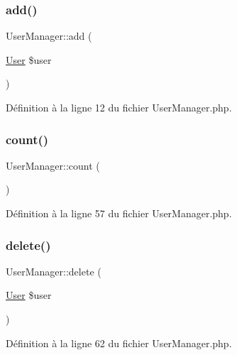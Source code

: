 \subsubsection{\texorpdfstring{add()}{add()}}
{\footnotesize\ttfamily User\+Manager\+::add (\begin{DoxyParamCaption}\item[{\mbox{\hyperlink{class_user}{User}}}]{\$user }\end{DoxyParamCaption})}



Définition à la ligne 12 du fichier User\+Manager.\+php.

\mbox{\label{class_user_manager_a15eb546aadcee7b28426bacf0df7f340}} 
\subsubsection{\texorpdfstring{count()}{count()}}
{\footnotesize\ttfamily User\+Manager\+::count (\begin{DoxyParamCaption}{ }\end{DoxyParamCaption})}



Définition à la ligne 57 du fichier User\+Manager.\+php.

\mbox{\label{class_user_manager_a2314547a8d8203652065e73e485a5af4}} 
\subsubsection{\texorpdfstring{delete()}{delete()}}
{\footnotesize\ttfamily User\+Manager\+::delete (\begin{DoxyParamCaption}\item[{\mbox{\hyperlink{class_user}{User}}}]{\$user }\end{DoxyParamCaption})}



Définition à la ligne 62 du fichier User\+Manager.\+php.

\mbox{\label{class_user_manager_a5ab80d63eb955da9e0ab01a9b1607437}} 
